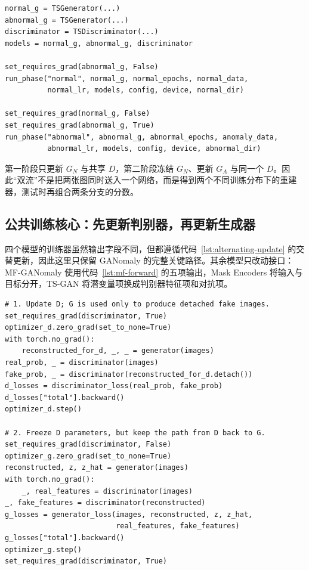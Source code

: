 \documentclass[UTF8,12pt]{ctexart}
\begin{document}
\begin{lstlisting}[style=pythonstyle,caption={TS-GAN 两条流的分阶段训练},label={lst:ts-stages}]
normal_g = TSGenerator(...)
abnormal_g = TSGenerator(...)
discriminator = TSDiscriminator(...)
models = normal_g, abnormal_g, discriminator

set_requires_grad(abnormal_g, False)
run_phase("normal", normal_g, normal_epochs, normal_data,
          normal_lr, models, config, device, normal_dir)

set_requires_grad(normal_g, False)
set_requires_grad(abnormal_g, True)
run_phase("abnormal", abnormal_g, abnormal_epochs, anomaly_data,
          abnormal_lr, models, config, device, abnormal_dir)
\end{lstlisting}

第一阶段只更新 $G_N$ 与共享 $D$，第二阶段冻结 $G_N$、更新 $G_A$ 与同一个 $D$。因此“双流”不是把两张图同时送入一个网络，而是得到两个不同训练分布下的重建器，测试时再组合两条分支的分数。

\subsection{公共训练核心：先更新判别器，再更新生成器}

四个模型的训练器虽然输出字段不同，但都遵循代码~\ref{lst:alternating-update} 的交替更新，因此这里只保留 GANomaly 的完整关键路径。其余模型只改动接口：MF-GANomaly 使用代码~\ref{lst:mf-forward} 的五项输出，Mask Encoders 将输入与目标分开，TS-GAN 将潜变量项换成判别器特征项和对抗项。

\begin{lstlisting}[style=pythonstyle,caption={单个批次中的判别器--生成器交替更新},label={lst:alternating-update}]
# 1. Update D; G is used only to produce detached fake images.
set_requires_grad(discriminator, True)
optimizer_d.zero_grad(set_to_none=True)
with torch.no_grad():
    reconstructed_for_d, _, _ = generator(images)
real_prob, _ = discriminator(images)
fake_prob, _ = discriminator(reconstructed_for_d.detach())
d_losses = discriminator_loss(real_prob, fake_prob)
d_losses["total"].backward()
optimizer_d.step()

# 2. Freeze D parameters, but keep the path from D back to G.
set_requires_grad(discriminator, False)
optimizer_g.zero_grad(set_to_none=True)
reconstructed, z, z_hat = generator(images)
with torch.no_grad():
    _, real_features = discriminator(images)
_, fake_features = discriminator(reconstructed)
g_losses = generator_loss(images, reconstructed, z, z_hat,
                          real_features, fake_features)
g_losses["total"].backward()
optimizer_g.step()
set_requires_grad(discriminator, True)
\end{lstlisting}
\end{document}
